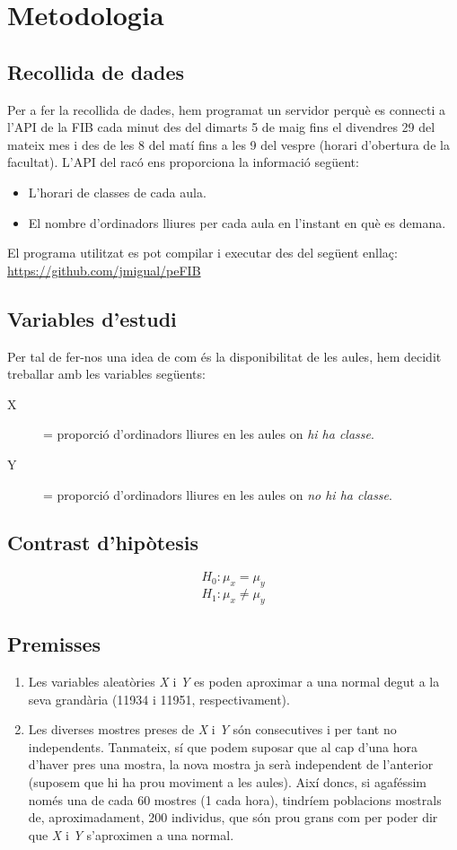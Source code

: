 \section{Metodologia}

\subsection{Recollida de dades}
Per a fer la recollida de dades, hem programat un servidor perquè es connecti a l'API de la FIB cada minut des del dimarts 5 de maig fins el divendres 29 del mateix mes i des de les 8 del matí fins a les 9 del vespre (horari d'obertura de la facultat). 
L'API del racó ens proporciona la informació següent:
\begin{itemize}
	\item L'horari de classes de cada aula.
	\item El nombre d'ordinadors lliures per cada aula en l'instant en què es demana.
\end{itemize}

El programa utilitzat es pot compilar i executar des del següent enllaç: \\
\url{https://github.com/jmigual/peFIB}

\subsection{Variables d'estudi}
Per tal de fer-nos una idea de com és la disponibilitat de les aules, hem decidit treballar amb les variables següents:
\begin{description}
	\item[X] = proporció d'ordinadors lliures en les aules on \emph{hi ha classe}.
	\item[Y] = proporció d'ordinadors lliures en les aules on \emph{no hi ha classe}.
\end{description}

\subsection{Contrast d'hipòtesis}
$$H_0: \mu_x = \mu_y$$
$$H_1: \mu_x \neq \mu_y$$

\subsection{Premisses}
\begin{enumerate}
	\item Les variables aleatòries \emph{X} i \emph{Y} es poden aproximar a una normal degut a la seva grandària (11934 i 11951, respectivament).
	\item Les diverses mostres preses de \emph{X} i \emph{Y} són consecutives i per tant no independents. Tanmateix, sí que podem suposar que al cap d'una hora d'haver pres una mostra, la nova mostra ja serà independent de l'anterior (suposem que hi ha prou moviment a les aules). Així doncs, si agaféssim només una de cada 60 mostres (1 cada hora), tindríem poblacions mostrals de, aproximadament, 200 individus, que són prou grans com per poder dir que \emph{X} i \emph{Y} s'aproximen a una normal.
\end{enumerate}

